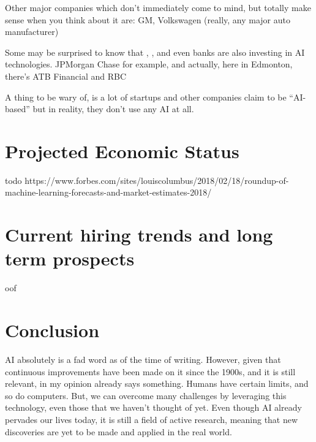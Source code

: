 \documentclass[letterpaper,12pt]{article}
\begin{document}
Other major companies which don't immediately come to mind, but totally make sense when you think about it are:
GM,
Volkswagen (really, any major auto manufacturer)

Some may be surprised to know that , , and even banks are also investing in AI technologies.
JPMorgan Chase for example, and actually, here in Edmonton, there's ATB Financial and RBC

A thing to be wary of, is a lot of startups and other companies claim to be ``AI-based''
but in reality, they don't use any AI at all. \cite{}

\section{Projected Economic Status}
todo \cite{forbesprojected}
https://www.forbes.com/sites/louiscolumbus/2018/02/18/roundup-of-machine-learning-forecasts-and-market-estimates-2018/

\section{Current hiring trends and long term prospects}
oof


\section{Conclusion}

AI absolutely is a fad word as of the time of writing. However, given that continuous improvements
have been made on it since the 1900s, and it is still relevant, in my opinion already says something.
Humans have certain limits, and so do computers. But, we can overcome many challenges by leveraging this technology,
even those that we haven't thought of yet. Even though AI already pervades our lives today,
it is still a field of active research\cite{uofaAI}, meaning that new
discoveries are yet to be made and applied in the real world.


\singlespacing
\nocite{*}
\printbibliography
% 
% 
\end{document}
